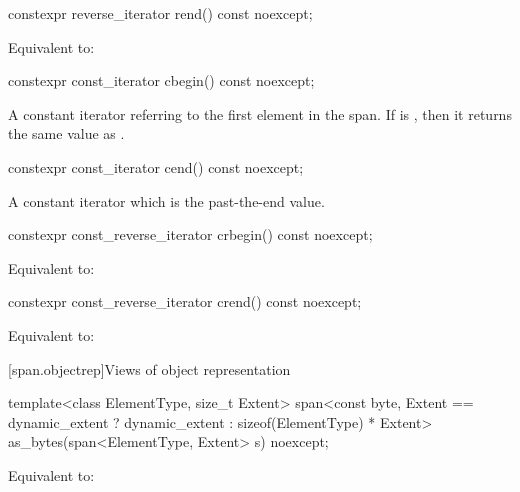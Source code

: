 %
\begin{itemdecl}
constexpr reverse_iterator rend() const noexcept;
\end{itemdecl}
\begin{itemdescr}
\pnum
\returns
Equivalent to: 
\end{itemdescr}

%
\begin{itemdecl}
constexpr const_iterator cbegin() const noexcept;
\end{itemdecl}
\begin{itemdescr}
\pnum
\returns
A constant iterator referring to the first element in the span.
If  is , then it returns the same value
as .
\end{itemdescr}

%
\begin{itemdecl}
constexpr const_iterator cend() const noexcept;
\end{itemdecl}
\begin{itemdescr}
\pnum
\returns
A constant iterator which is the past-the-end value.
\end{itemdescr}

%
\begin{itemdecl}
constexpr const_reverse_iterator crbegin() const noexcept;
\end{itemdecl}
\begin{itemdescr}
\pnum
\effects
Equivalent to: 
\end{itemdescr}

%
\begin{itemdecl}
constexpr const_reverse_iterator crend() const noexcept;
\end{itemdecl}
\begin{itemdescr}
\pnum
\effects
Equivalent to: 
\end{itemdescr}


[span.objectrep]{Views of object representation}

%
\begin{itemdecl}
template<class ElementType, size_t Extent>
  span<const byte, Extent == dynamic_extent ? dynamic_extent : sizeof(ElementType) * Extent>
    as_bytes(span<ElementType, Extent> s) noexcept;
\end{itemdecl}
\begin{itemdescr}
\pnum
\effects
Equivalent to: 
\end{itemdescr}


